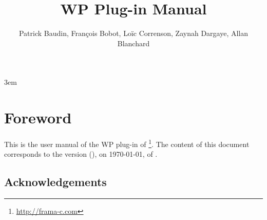 \documentclass{frama-c-book}
\title{WP Plug-in Manual}
\author{Patrick Baudin, François Bobot, Loïc Correnson, Zaynah Dargaye, Allan Blanchard}
\newcommand{\FCVERSION}{(\unskip)}
\begin{document}
\sloppy
\emergencystretch 3em

\maketitle
\tableofcontents

\chapter*{Foreword}
\markright{}

This is the user manual of the WP plug-in of \FramaC\footnote{\url{http://frama-c.com}}.
The content of this document corresponds to the version \FCVERSION, on \today, of
\FramaC.

\section*{Acknowledgements}

\medskip










\end{document}
